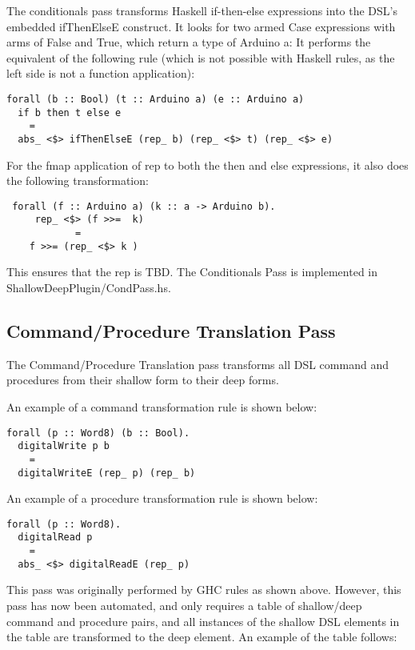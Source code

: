 \documentclass[11pt, oneside]{article}   	%
\begin{document}
The conditionals pass transforms Haskell if-then-else expressions into the DSL's
embedded ifThenElseE construct.  It looks for two armed Case expressions with
arms of False and True, which return a type of Arduino a:  It performs the equivalent
of the following rule (which is not possible with Haskell rules, as the left side is not
a function application):

\begin{verbatim}
forall (b :: Bool) (t :: Arduino a) (e :: Arduino a)
  if b then t else e
    =
  abs_ <$> ifThenElseE (rep_ b) (rep_ <$> t) (rep_ <$> e)
\end{verbatim}

For the fmap application of rep to both the then and else expressions, it also
does the following transformation:

\begin{verbatim}
 forall (f :: Arduino a) (k :: a -> Arduino b).
     rep_ <$> (f >>=  k)
            =
    f >>= (rep_ <$> k )
\end{verbatim}

This ensures that the rep is TBD.
The Conditionals Pass is implemented in ShallowDeepPlugin/CondPass.hs.

\subsection{Command/Procedure Translation Pass}

The Command/Procedure Translation pass transforms all DSL command and procedures from their 
shallow form to their deep forms.

An example of a command transformation rule is shown below:

\begin{verbatim}
forall (p :: Word8) (b :: Bool).  
  digitalWrite p b  
    =  
  digitalWriteE (rep_ p) (rep_ b)  
\end{verbatim}

An example of a procedure transformation rule is shown below:

\begin{verbatim}
forall (p :: Word8).
  digitalRead p 
    =  
  abs_ <$> digitalReadE (rep_ p)
 \end{verbatim}

This pass was originally performed by GHC rules as shown above.  However,
this pass has now been automated, and only requires a table of shallow/deep
command and procedure pairs, and all instances of the shallow DSL elements
in the table are transformed to the deep element. An example of the table follows:
\end{document}
